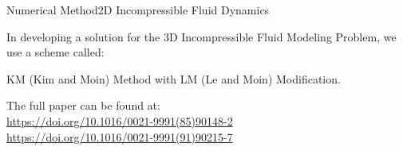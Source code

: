 \documentclass[\string~/GitHub/sthlmNordBeamerTheme/sthlmNordLightDemo.tex]{subfiles}
\begin{document}
\begin{frame}{Numerical Method}{2D Incompressible Fluid Dynamics}
    \framebreak

    \soln In developing a solution for the 3D Incompressible Fluid Modeling Problem, we use a scheme called:
    
    \begin{block}{}
        \begin{center}
            KM (Kim and Moin) Method with LM (Le and Moin) Modification.
        \end{center}
    \end{block}

    \vspace{1em}
    
    \begin{center}
        \large{The full paper can be found at:} \\
        \url{https://doi.org/10.1016/0021-9991(85)90148-2}\\
        \url{https://doi.org/10.1016/0021-9991(91)90215-7}
                
        
    \end{center}
            
\end{frame}
\end{document}
